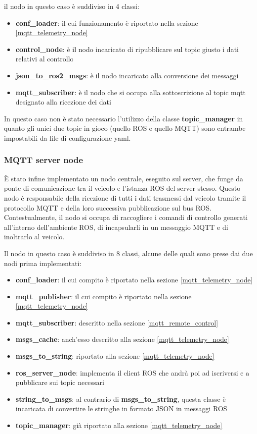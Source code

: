 \noindent il nodo in questo caso è suddiviso in 4 classi: 

\begin{itemize}
  \item \textbf{conf\_loader}: il cui funzionamento è riportato nella sezione \ref{mqtt_telemetry_node}
  \item \textbf{control\_node}: è il nodo incaricato di ripubblicare sul topic giusto i dati relativi al controllo
  \item \textbf{json\_to\_ros2\_msgs}: è il nodo incaricato alla conversione dei messaggi
  \item \textbf{mqtt\_subscriber}: è il nodo che si occupa alla sottoscrizione al topic mqtt designato alla ricezione dei dati
\end{itemize}

\noindent In questo caso non è stato necessario l'utilizzo della classe \textbf{topic\_manager} in quanto gli unici due topic in gioco (quello ROS e quello MQTT) sono entrambe impostabili da file di configurazione yaml.

\subsubsection{MQTT server node}
È stato infine implementato un nodo centrale, eseguito sul server, che funge da ponte di comunicazione tra il veicolo e l'istanza ROS del server stesso. Questo nodo è responsabile della ricezione di tutti i dati trasmessi dal veicolo tramite il protocollo MQTT e della loro successiva pubblicazione sul bus ROS. Contestualmente, il nodo si occupa di raccogliere i comandi di controllo generati all'interno dell'ambiente ROS, di incapsularli in un messaggio MQTT e di inoltrarlo al veicolo.

\noindent Il nodo in questo caso è suddiviso in 8 classi, alcune delle quali sono prese dai due nodi prima implementati:

\begin{itemize}
  \item \textbf{conf\_loader}: il cui compito è riportato nella sezione \ref{mqtt_telemetry_node}
  \item \textbf{mqtt\_publisher}: il cui compito è riportato nella sezione \ref{mqtt_telemetry_node}
  \item \textbf{mqtt\_subscriber}: descritto nella sezione \ref{mqtt_remote_control}
  \item \textbf{msgs\_cache}: anch'esso descritto alla sezione \ref{mqtt_telemetry_node}
  \item \textbf{msgs\_to\_string}: riportato alla sezione \ref{mqtt_telemetry_node}
  \item \textbf{ros\_server\_node}: implementa il client ROS che andrà poi ad iscriversi e a pubblicare sui topic necessari
  \item \textbf{string\_to\_msgs}: al contrario di \textbf{msgs\_to\_string}, questa classe è incaricata di convertire le stringhe in formato JSON in messaggi ROS
  \item \textbf{topic\_manager}: già riportato alla sezione \ref{mqtt_telemetry_node}
\end{itemize}

